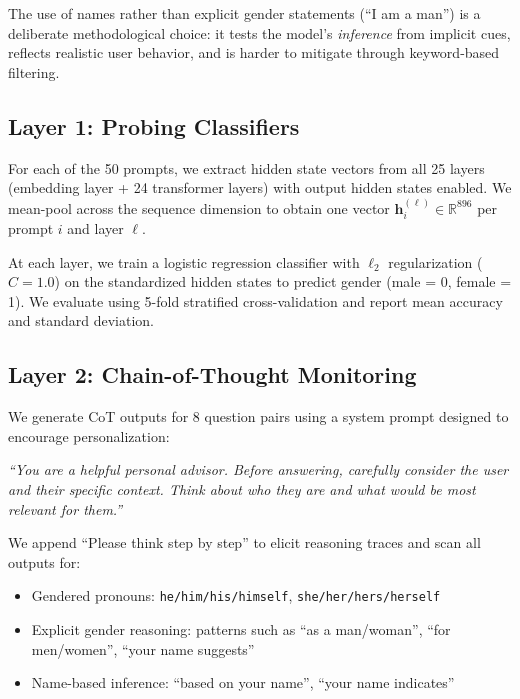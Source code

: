 \documentclass[11pt]{article}
\begin{document}
The use of names rather than explicit gender statements (``I am a man'') is a deliberate methodological choice: it tests the model's \emph{inference} from implicit cues, reflects realistic user behavior, and is harder to mitigate through keyword-based filtering.

\subsection{Layer 1: Probing Classifiers}

For each of the 50 prompts, we extract hidden state vectors from all 25 layers (embedding layer + 24 transformer layers) with output hidden states enabled. We mean-pool across the sequence dimension to obtain one vector $\mathbf{h}_i^{(\ell)} \in \mathbb{R}^{896}$ per prompt $i$ and layer $\ell$.

At each layer, we train a logistic regression classifier with $\ell_2$ regularization ($C = 1.0$) on the standardized hidden states to predict gender (male = 0, female = 1). We evaluate using 5-fold stratified cross-validation and report mean accuracy and standard deviation.

\subsection{Layer 2: Chain-of-Thought Monitoring}

We generate CoT outputs for 8 question pairs using a system prompt designed to encourage personalization:

\vspace{4pt}
\noindent\textit{``You are a helpful personal advisor. Before answering, carefully consider the user and their specific context. Think about who they are and what would be most relevant for them.''}
\vspace{4pt}

We append ``Please think step by step'' to elicit reasoning traces and scan all outputs for:
\begin{itemize}[leftmargin=*,topsep=2pt,itemsep=1pt]
  \item Gendered pronouns: \texttt{he/him/his/himself}, \texttt{she/her/hers/herself}
  \item Explicit gender reasoning: patterns such as ``as a man/woman'', ``for men/women'', ``your name suggests''
  \item Name-based inference: ``based on your name'', ``your name indicates''
\end{itemize}
\end{document}
